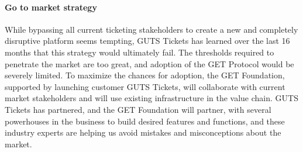 \documentclass[letterpaper,10pt]{article}
\begin{document}
\paragraph{Go to market strategy} While bypassing all current ticketing stakeholders to create a new and completely disruptive platform seems tempting, GUTS Tickets has learned over the last 16 months that this strategy would ultimately fail. The thresholds required to penetrate the market are too great, and adoption of the GET Protocol would be severely limited. To maximize the chances for adoption, the GET Foundation, supported by launching customer GUTS Tickets, will collaborate with current market stakeholders and will use existing infrastructure in the value chain. GUTS Tickets has partnered, and the GET Foundation will partner, with several powerhouses in the business to build desired features and functions, and these industry experts are helping us avoid mistakes and misconceptions about the market.\\ 
\vspace{-0.4cm}
\end{document}
